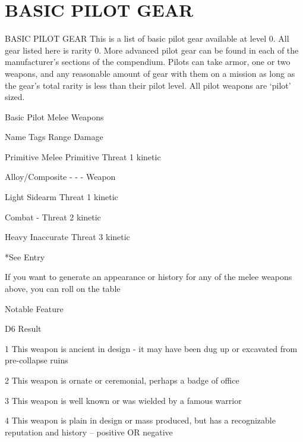 \section{BASIC PILOT GEAR}
                                         BASIC PILOT GEAR  
This is a list of basic pilot gear available at level 0. All gear listed here is rarity 0. More  
advanced pilot gear can be found in each of the manufacturer’s sections of the compendium.  
Pilots can take armor, one or two weapons, and any reasonable amount of gear with them on a  
mission as long as the gear’s total rarity is less than their pilot level. All pilot weapons are ‘pilot’  
sized.
 

                                        Basic Pilot Melee Weapons  

 Name                      Tags                                       Range             Damage 

 Primitive Melee           Primitive                                  Threat            1 kinetic 

 Alloy/Composite           -                                          -                 - 
 Weapon 

                    Light  Sidearm                                    Threat            1 kinetic 

                 Combat    -                                          Threat            2 kinetic 

                  Heavy    Inaccurate                                 Threat            3 kinetic 

*See Entry
 

                                                                                                             


If you want to generate an appearance or history for any of the melee weapons above, you can roll on the  
table
 

                                                      Notable Feature
 

 D6      Result 

  1      This weapon is ancient in design - it may have been dug up or excavated from pre-collapse ruins 

 2       This weapon is ornate or ceremonial, perhaps a badge of office 

 3       This weapon is well known or was wielded by a famous warrior 

 4       This weapon is plain in design or mass produced, but has a recognizable reputation and history -- positive  
         OR negative 

